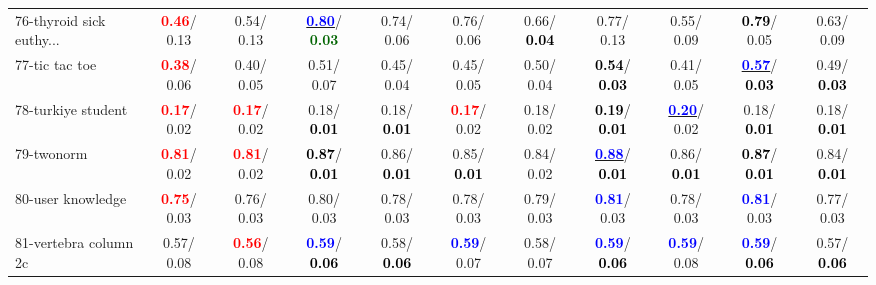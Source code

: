 \begin{table}[h]
\begin{center}
{\begin{tabular}{lc|c|c|c|c|c|c|c|c|c}
76-thyroid sick euthy... & \textcolor{red}{\textbf{  0.46}}/  0.13 &   0.54/  0.13 & \underline{\textcolor{blue}{\textbf{  0.80}}}/\textcolor{darkgreen}{\textbf{  0.03}} &   0.74/  0.06 &   0.76/  0.06 &   0.66/\textcolor{black}{\textbf{  0.04}} &   0.77/  0.13 &   0.55/  0.09 & \textcolor{black}{\textbf{  0.79}}/  0.05 &   0.63/  0.09 \\
77-tic tac toe & \textcolor{red}{\textbf{  0.38}}/  0.06 &   0.40/  0.05 &   0.51/  0.07 &   0.45/  0.04 &   0.45/  0.05 &   0.50/  0.04 & \textcolor{black}{\textbf{  0.54}}/\textcolor{black}{\textbf{  0.03}} &   0.41/  0.05 & \underline{\textcolor{blue}{\textbf{  0.57}}}/\textcolor{black}{\textbf{  0.03}} &   0.49/\textcolor{black}{\textbf{  0.03}} \\
78-turkiye student & \textcolor{red}{\textbf{  0.17}}/  0.02 & \textcolor{red}{\textbf{  0.17}}/  0.02 &   0.18/\textcolor{black}{\textbf{  0.01}} &   0.18/\textcolor{black}{\textbf{  0.01}} & \textcolor{red}{\textbf{  0.17}}/  0.02 &   0.18/  0.02 & \textcolor{black}{\textbf{  0.19}}/\textcolor{black}{\textbf{  0.01}} & \underline{\textcolor{blue}{\textbf{  0.20}}}/  0.02 &   0.18/\textcolor{black}{\textbf{  0.01}} &   0.18/\textcolor{black}{\textbf{  0.01}} \\ \hline
79-twonorm & \textcolor{red}{\textbf{  0.81}}/  0.02 & \textcolor{red}{\textbf{  0.81}}/  0.02 & \textcolor{black}{\textbf{  0.87}}/\textcolor{black}{\textbf{  0.01}} &   0.86/\textcolor{black}{\textbf{  0.01}} &   0.85/\textcolor{black}{\textbf{  0.01}} &   0.84/  0.02 & \underline{\textcolor{blue}{\textbf{  0.88}}}/\textcolor{black}{\textbf{  0.01}} &   0.86/\textcolor{black}{\textbf{  0.01}} & \textcolor{black}{\textbf{  0.87}}/\textcolor{black}{\textbf{  0.01}} &   0.84/\textcolor{black}{\textbf{  0.01}} \\
80-user knowledge & \textcolor{red}{\textbf{  0.75}}/  0.03 &   0.76/  0.03 &   0.80/  0.03 &   0.78/  0.03 &   0.78/  0.03 &   0.79/  0.03 & \textcolor{blue}{\textbf{  0.81}}/  0.03 &   0.78/  0.03 & \textcolor{blue}{\textbf{  0.81}}/  0.03 &   0.77/  0.03 \\
81-vertebra column 2c &   0.57/  0.08 & \textcolor{red}{\textbf{  0.56}}/  0.08 & \textcolor{blue}{\textbf{  0.59}}/\textcolor{black}{\textbf{  0.06}} &   0.58/\textcolor{black}{\textbf{  0.06}} & \textcolor{blue}{\textbf{  0.59}}/  0.07 &   0.58/  0.07 & \textcolor{blue}{\textbf{  0.59}}/\textcolor{black}{\textbf{  0.06}} & \textcolor{blue}{\textbf{  0.59}}/  0.08 & \textcolor{blue}{\textbf{  0.59}}/\textcolor{black}{\textbf{  0.06}} &   0.57/\textcolor{black}{\textbf{  0.06}} \\

\end{tabular}}
\end{center}
\end{table}
